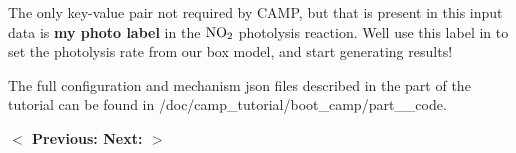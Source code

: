The only key-\/value pair not required by CAMP, but that is present in this input data is {\bfseries{my photo label}} in the $\ce{NO2}$ photolysis reaction. We\textquotesingle{}ll use this label in  to set the photolysis rate from our box model, and start generating results!

The full configuration and mechanism {\ttfamily json} files described in the part of the tutorial can be found in {\ttfamily /doc/camp\+\_\+tutorial/boot\+\_\+camp/part\+\_\+\_\+code}.

 {\bfseries{ \texorpdfstring{$<$}{<} Previous\+: }}     {\bfseries{ Next\+: }}  {\bfseries{ \texorpdfstring{$>$}{>} }} 